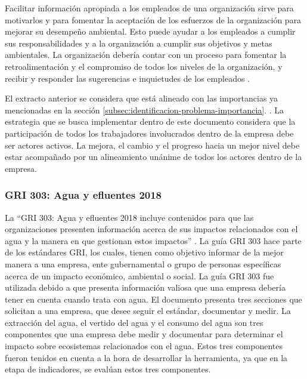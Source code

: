 \hfill
\par
\leftskip=0.35in \rightskip=0.35in
Facilitar informaci\'on apropiada a los empleados de una organizaci\'on sirve para motivarlos y para fomentar la aceptaci\'on de los esfuerzos de la organizaci\'on para mejorar su desempe\~no ambiental. Esto puede ayudar a los empleados a cumplir sus responsabilidades y a la organizaci\'on a cumplir sus objetivos y metas ambientales. La organizaci\'on deber\'ia contar con un proceso para fomentar la retroalimentaci\'on y el compromiso de todos los niveles de la organizaci\'on, y recibir y responder las sugerencias e inquietudes de los empleados \parencite{iso-2004}. 

\hfill
\par
\leftskip=0in \rightskip=0in

El extracto anterior se considera que está alineado con las importancias ya mencionadas en la sección \ref{subsec:identificacion-problema-importancia}. . La estrategia que se busca implementar dentro de este documento considera que la participación de todos los trabajadores involucrados dentro de la empresa debe ser actores activos. La mejora, el cambio y el progreso hacia un mejor nivel debe estar acompañado por un alineamiento unánime de todos los actores dentro de la empresa. 

\subsubsection{GRI 303: Agua y efluentes 2018}

La “GRI 303: Agua y efluentes 2018 incluye contenidos para que las organizaciones presenten información acerca de sus impactos relacionados con el agua y la manera en que gestionan estos impactos” \parencite{gri-2019}. La guía GRI 303 hace parte de los estándares GRI, los cuales, tienen como objetivo informar de la mejor manera a una empresa, ente gubernamental o grupo de personas específicas acerca de un impacto económico, ambiental o social.  La guía GRI 303 fue utilizada debido a que presenta información valiosa que una empresa debería tener en cuenta cuando trata con agua. El documento presenta tres secciones que solicitan a una empresa, que desee seguir el estándar, documentar y medir. La extracción del agua, el vertido del agua y el consumo del agua son tres componentes que una empresa debe medir y documentar para determinar el impacto sobre ecosistemas relacionados con el agua. Estos tres componentes fueron tenidos en cuenta a la hora de desarrollar la herramienta, ya que en la etapa de indicadores, se evalúan estos tres componentes.


